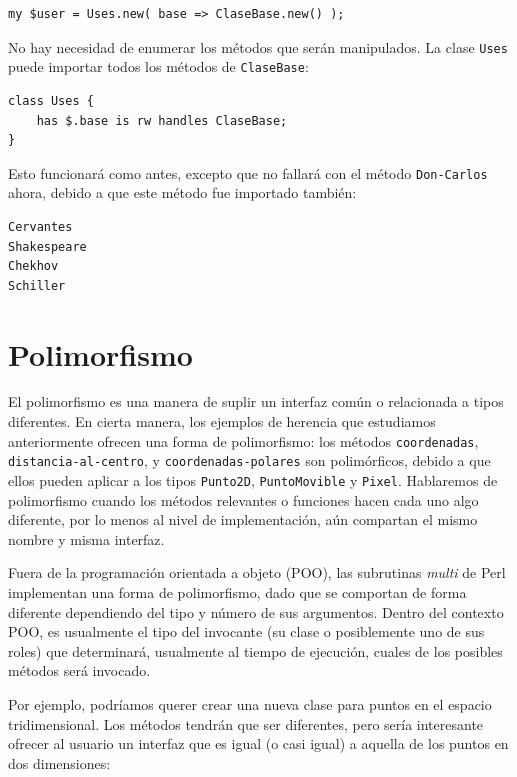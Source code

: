 \begin{lstlisting}
my $user = Uses.new( base => ClaseBase.new() );
\end{lstlisting}

No hay necesidad de enumerar los métodos que serán manipulados.
La clase {\tt Uses} puede importar todos los métodos de 
{\tt ClaseBase}:

\begin{lstlisting}
class Uses { 
    has $.base is rw handles ClaseBase;
}
\end{lstlisting}

Esto funcionará como antes, excepto que no fallará con el método
{\tt Don-Carlos} ahora, debido a que este método fue importado también:

\begin{lstlisting}
Cervantes
Shakespeare
Chekhov
Schiller
\end{lstlisting} 

\section{Polimorfismo}

El polimorfismo es una manera de suplir un interfaz común o 
relacionada a tipos diferentes. En cierta manera, los ejemplos
de herencia que estudiamos anteriormente ofrecen una forma
de polimorfismo: los métodos {\tt coordenadas}, {\tt distancia-al-centro}, y {\tt coordenadas-polares} son polimórficos, debido a que ellos pueden aplicar a los tipos
{\tt Punto2D}, {\tt PuntoMovible} y {\tt Pixel}. Hablaremos de
polimorfismo cuando los métodos relevantes o funciones hacen cada uno algo diferente, por lo menos al nivel de implementación, aún
compartan el mismo nombre y misma interfaz.

Fuera de la programación orientada a objeto (POO), las subrutinas
\emph{multi} de Perl implementan una forma de polimorfismo,
dado que se comportan de forma diferente dependiendo del tipo
y número de sus argumentos. Dentro del contexto POO, es
usualmente el tipo del invocante (su clase o posiblemente uno de
sus roles) que determinará, usualmente al tiempo de 
ejecución, cuales de los posibles métodos será invocado.

Por ejemplo, podríamos querer crear una nueva clase para 
puntos en el espacio tridimensional. Los métodos tendrán 
que ser diferentes, pero sería interesante ofrecer al usuario
un interfaz que es igual (o casi igual)  a aquella de los
puntos en dos dimensiones:

